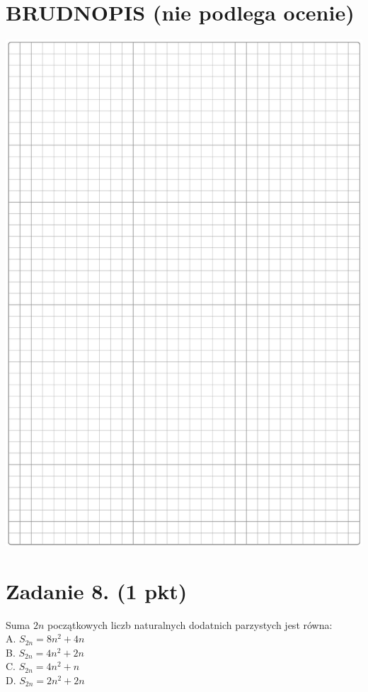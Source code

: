\documentclass[10pt]{article}
\begin{document}
\section*{BRUDNOPIS (nie podlega ocenie)}
\begin{center}
\includegraphics[max width=\textwidth]{2024_11_21_a38d702bc7be8115942cg-03}
\end{center}

\section*{Zadanie 8. (1 pkt)}
Suma \(2 n\) początkowych liczb naturalnych dodatnich parzystych jest równa:\\
A. \(S_{2 n}=8 n^{2}+4 n\)\\
B. \(S_{2 n}=4 n^{2}+2 n\)\\
C. \(S_{2 n}=4 n^{2}+n\)\\
D. \(S_{2 n}=2 n^{2}+2 n\)
\end{document}
